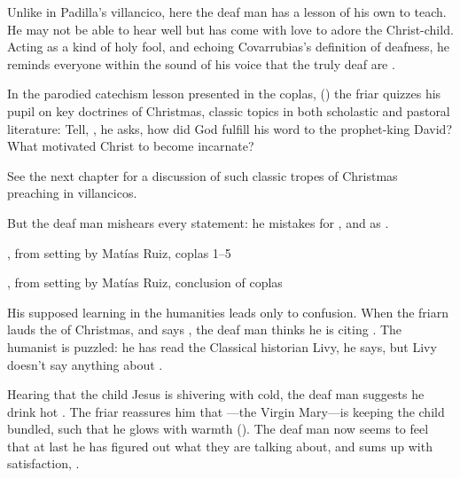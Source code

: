 Unlike in Padilla's villancico, here the deaf man has a lesson of his own to teach.
He may not be able to hear well but has come with love to adore the Christ-child. 
Acting as a kind of holy fool, and echoing Covarrubias's definition of deafness, he reminds everyone within the sound of his voice that the truly deaf are .

In the parodied catechism lesson presented in the coplas, () the friar quizzes his pupil on key doctrines of Christmas, classic topics in both scholastic and pastoral literature:
Tell, , he asks, how did God fulfill his word to the prophet-king David?
What motivated Christ to become incarnate?%
    \begin{Footnote}
        See the next chapter for a discussion of such classic tropes of Christmas preaching in villancicos.
    \end{Footnote}
But the deaf man mishears every statement: he mistakes  for , and  as .

\begin{expoem}
    \caption{, from setting by Matías Ruiz, coplas 1--5}
    \label{expoem:Pues_la_fiesta-Ruiz-coplas-1}
\end{expoem}

\begin{expoem}
    \caption{, from setting by Matías Ruiz, conclusion of coplas}
    \label{expoem:Pues_la_fiesta-Ruiz-coplas-2}
\end{expoem}

His supposed learning in the humanities leads only to confusion.
When the friarn lauds the  of Christmas, and says , the deaf man thinks he is citing .
The humanist is puzzled: he has read the Classical historian Livy, he says, but Livy doesn't say anything about .

Hearing that the child Jesus is shivering with cold, the deaf man suggests he drink hot .
The friar reassures him that ---the Virgin Mary---is keeping the child bundled, such that he glows with warmth ().
The deaf man now seems to feel that at last he has figured out what they are talking about, and sums up with satisfaction, .

